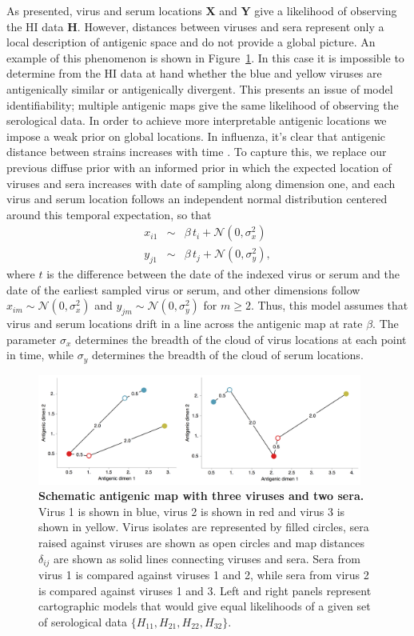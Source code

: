 \documentclass[11pt,oneside,letterpaper]{article}
\newcommand{\viruses}{\mathbf{X}}					%
\newcommand{\sera}{\mathbf{Y}}						%
\newcommand{\virussd}{\sigma_x}						%
\newcommand{\serumsd}{\sigma_y}						%
\newcommand{\normal}{\mathcal{N}}					%
\begin{document}
As presented, virus and serum locations $\viruses$ and $\sera$ give a likelihood of observing the HI data $\mathbf{H}$.
However, distances between viruses and sera represent only a local description of antigenic space and do not provide a global picture.
An example of this phenomenon is shown in Figure~\ref{schematic_map}.
In this case it is impossible to determine from the HI data at hand whether the blue and yellow viruses are antigenically similar or antigenically divergent. 
This presents an issue of model identifiability; multiple antigenic maps give the same likelihood of observing the serological data.
In order to achieve more interpretable antigenic locations we impose a weak prior on global locations.
In influenza, it's clear that antigenic distance between strains increases with time \cite{Smith04,Cai10}.
To capture this, we replace our previous diffuse prior with an informed prior in which the expected location of viruses and sera increases with date of sampling along dimension one, and each virus and serum location follows an independent normal distribution centered around this temporal expectation, so that
\begin{eqnarray}
	x_{i1} &\sim& \beta \, t_i + \normal(0, \virussd^2) \nonumber \\
	y_{j1} &\sim& \beta \, t_j + \normal(0, \serumsd^2),
\end{eqnarray}
where $t$ is the difference between the date of the indexed virus or serum and the date of the earliest sampled virus or serum, and other dimensions follow $x_{im} \sim \normal(0, \virussd^2)$ and $y_{jm} \sim \normal(0, \serumsd^2)$ for $m\ge2$.
Thus, this model assumes that virus and serum locations drift in a line across the antigenic map at rate $\beta$.
The parameter $\virussd$ determines the breadth of the cloud of virus locations at each point in time, while $\serumsd$ determines the breadth of the cloud of serum locations.

\begin{figure}[tb]
	\centering		
	\includegraphics[width=0.95\textwidth]{figures/schematic_map}
	\caption{\textbf{Schematic antigenic map with three viruses and two sera.} 
	Virus 1 is shown in blue, virus 2 is shown in red and virus 3 is shown in yellow.
	Virus isolates are represented by filled circles, sera raised against viruses are shown as open circles and map distances $\delta_{ij}$ are shown as solid lines connecting viruses and sera.
	Sera from virus 1 is compared against viruses 1 and 2, while sera from virus 2 is compared against viruses 1 and 3.
	Left and right panels represent cartographic models that would give equal likelihoods of a given set of serological data $\{H_{11},H_{21},H_{22},H_{32}\}$.
	} 
	\label{schematic_map} 
\end{figure}
\end{document}
